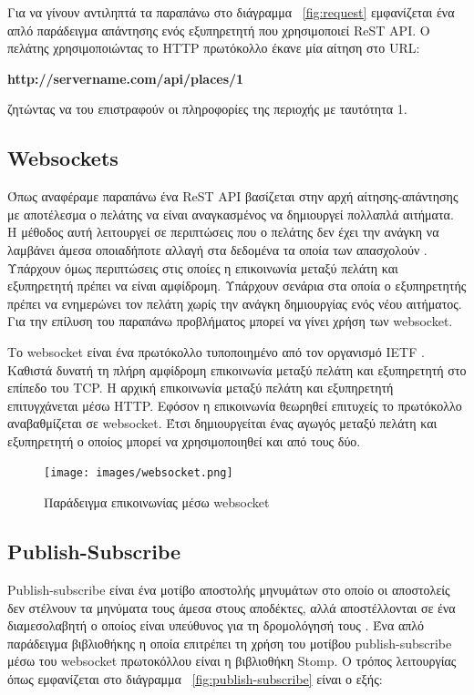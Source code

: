 Για να γίνουν αντιληπτά τα παραπάνω στο διάγραμμα ~\ref{fig:request} εμφανίζεται ένα απλό παράδειγμα απάντησης ενός εξυπηρετητή που χρησιμοποιεί ReST API. Ο πελάτης χρησιμοποιώντας το HTTP πρωτόκολλο έκανε μία αίτηση στο URL:

\textbf{http://servername.com/api/places/1}

ζητώντας να του επιστραφούν οι πληροφορίες της περιοχής με ταυτότητα 1.

\subsection{Websockets}
Όπως αναφέραμε παραπάνω ένα ReST API βασίζεται στην αρχή αίτησης-απάντησης με αποτέλεσμα ο πελάτης να είναι αναγκασμένος να δημιουργεί πολλαπλά αιτήματα. Η μέθοδος αυτή λειτουργεί σε περιπτώσεις που ο πελάτης δεν έχει την ανάγκη να λαμβάνει άμεσα οποιαδήποτε αλλαγή στα δεδομένα τα οποία των απασχολούν 
. Υπάρχουν όμως περιπτώσεις στις οποίες η επικοινωνία μεταξύ πελάτη και εξυπηρετητή πρέπει να είναι αμφίδρομη. Υπάρχουν σενάρια στα οποία ο εξυπηρετητής πρέπει να ενημερώνει τον πελάτη χωρίς την ανάγκη δημιουργίας ενός νέου αιτήματος. Για την επίλυση του παραπάνω προβλήματος μπορεί να γίνει χρήση των websocket.
\par
Το websocket είναι ένα πρωτόκολλο τυποποιημένο από τον οργανισμό IETF \citep{websockets}. Καθιστά δυνατή τη πλήρη αμφίδρομη επικοινωνία μεταξύ πελάτη και εξυπηρετητή στο επίπεδο του TCP. Η αρχική επικοινωνία μεταξύ πελάτη και εξυπηρετητή επιτυγχάνεται μέσω HTTP. Εφόσον η επικοινωνία θεωρηθεί επιτυχείς το πρωτόκολλο αναβαθμίζεται σε websocket. Έτσι δημιουργείται ένας αγωγός μεταξύ πελάτη και εξυπηρετητή ο οποίος μπορεί να χρησιμοποιηθεί και από τους δύο.

\begin{figure}[h]
  \centering
  \texttt{[image: images/websocket.png]}
  \caption{Παράδειγμα επικοινωνίας μέσω websocket}
  \label{fig:websocket}
\end{figure}

\newpage

\subsection{Publish-Subscribe}
Publish-subscribe είναι ένα μοτίβο αποστολής μηνυμάτων στο οποίο οι αποστολείς δεν στέλνουν τα μηνύματα τους άμεσα στους αποδέκτες, αλλά αποστέλλονται σε ένα διαμεσολαβητή ο οποίος είναι υπεύθυνος για τη δρομολόγησή τους \citep{publishSubscribeWiki}. Ένα απλό παράδειγμα βιβλιοθήκης η οποία επιτρέπει τη χρήση του μοτίβου publish-subscribe μέσω του websocket πρωτοκόλλου είναι η βιβλιοθήκη Stomp. Ο τρόπος λειτουργίας όπως εμφανίζεται στο διάγραμμα ~\ref{fig:publish-subscribe} είναι ο εξής:

